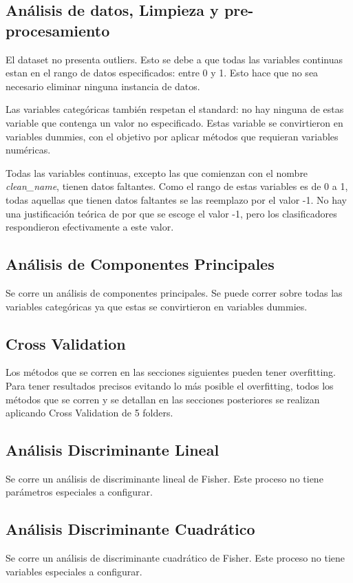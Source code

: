 \documentclass[journal]{IEEEtran}
\begin{document}
\subsection{Análisis de datos, Limpieza y pre-procesamiento}
El dataset no presenta outliers. Esto se debe a que todas las variables continuas estan
en el rango de datos especificados: entre 0 y 1. 
Esto hace que no sea necesario eliminar ninguna
instancia de datos.

Las variables categóricas también respetan el standard: no hay ninguna
de estas variable que contenga un valor no especificado. Estas 
variable se convirtieron en variables dummies, con el objetivo 
por aplicar métodos que requieran variables numéricas.

Todas las variables continuas, excepto las que comienzan con el
nombre \textit{clean\_name}, tienen datos faltantes. Como el rango
de estas variables es de 0 a 1, todas aquellas que tienen datos
faltantes se las reemplazo por el valor -1. No hay una justificación
teórica de por que se escoge el valor -1, pero los clasificadores
respondieron efectivamente a este valor.

\subsection{Análisis de Componentes Principales}
Se corre un análisis de componentes principales. Se puede correr sobre
todas las variables categóricas ya que estas se convirtieron en 
variables dummies.

\subsection{Cross Validation}
Los métodos que se corren en las secciones siguientes pueden tener overfitting. Para
tener resultados precisos evitando lo más posible el overfitting, todos los
métodos que se corren y se detallan en las secciones posteriores se realizan
aplicando Cross Validation de 5 folders.

\subsection{Análisis Discriminante Lineal}
Se corre un análisis de discriminante lineal de Fisher. Este proceso no 
tiene parámetros especiales a configurar.

\subsection{Análisis Discriminante Cuadrático}
Se corre un análisis de discriminante cuadrático de Fisher. Este proceso
no tiene variables especiales a configurar.
\end{document}
